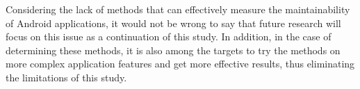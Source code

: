 Considering the lack of methods that can effectively measure the maintainability of Android applications, it would not be wrong to say that future research will focus on this issue as a continuation of this study. In addition, in the case of determining these methods, it is also among the targets to try the methods on more complex application features and get more effective results, thus eliminating the limitations of this study.